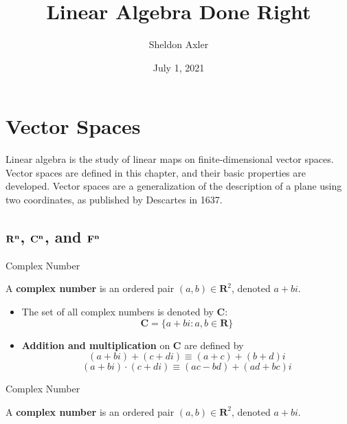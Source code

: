 \documentclass[11pt]{article} %
\title{\LARGE {Linear Algebra Done Right}}
\author{Sheldon Axler}
\date{July 1, 2021}
\begin{document}
\maketitle

\section{Vector Spaces}

Linear algebra is the study of linear maps on finite-dimensional vector spaces. Vector spaces are defined in this chapter, and their basic properties are developed. Vector spaces are a generalization of the description of a plane using two coordinates, as published by Descartes in 1637. 

\subsection{$\mathbf{R^n}$, $\mathbf{C^n}$, and $\mathbf{F^n}$}

\begin{deff}{Complex Number}

A \textbf{complex number} is an ordered pair $(a,b) \in \mathbf{R}^2$, denoted $a + bi$.
\begin{itemize}
\item The set of all complex numbers is denoted by $\mathbf{C}$:
  $$
    \mathbf{C} = \{a+bi : a,b \in \mathbf{R}\}
  $$
 \item \textbf{Addition and multiplication} on $\mathbf{C}$ are defined by
  $$
  (a + bi) + (c + di) \equiv (a + c) + (b + d)i 
  $$
  $$
  (a + bi)\cdot(c+di) \equiv (ac - bd) + (ad + bc)i
  $$
\end{itemize}
\end{deff}

\begin{thmm}{Complex Number}

A \textbf{complex number} is an ordered pair $(a,b) \in \mathbf{R}^2$, denoted $a + bi$.
\end{thmm}
\end{document}
